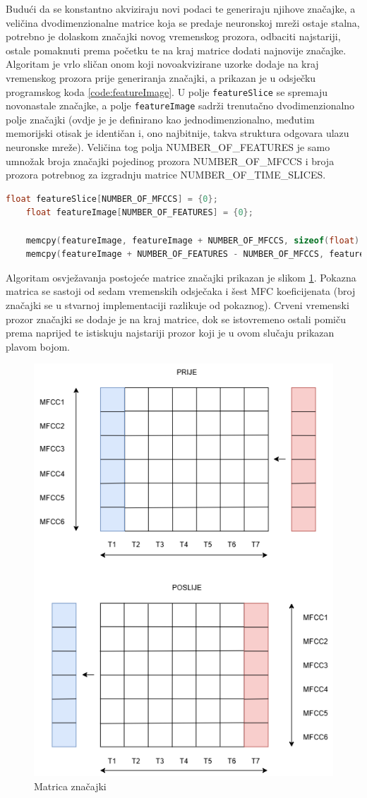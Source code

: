 Budući da se konstantno akviziraju novi podaci te generiraju njihove značajke, a veličina
dvodimenzionalne matrice koja se predaje neuronskoj mreži ostaje stalna, potrebno je 
dolaskom značajki novog vremenskog prozora, odbaciti najstariji, ostale pomaknuti prema početku
te na kraj matrice dodati najnovije značajke. Algoritam je vrlo sličan onom koji novoakvizirane
uzorke dodaje na kraj vremenskog prozora prije generiranja značajki, a prikazan je u odsječku
programskog koda \ref{code:featureImage}. U polje \texttt{featureSlice} se spremaju novonastale
značajke, a polje \texttt{featureImage} sadrži trenutačno dvodimenzionalno polje značajki (ovdje je
je definirano kao jednodimenzionalno, međutim memorijski otisak je identičan i, ono najbitnije,
takva struktura odgovara ulazu neuronske mreže). Veličina tog polja NUMBER\_OF\_FEATURES je samo
umnožak broja značajki pojedinog prozora NUMBER\_OF\_MFCCS i broja prozora potrebnog za 
izgradnju matrice NUMBER\_OF\_TIME\_SLICES.
\newpage
\begin{lstlisting}[language=C++, caption=Generiranje matrice značajki, label=code:featureImage]
    float featureSlice[NUMBER_OF_MFCCS] = {0};
    float featureImage[NUMBER_OF_FEATURES] = {0};

    memcpy(featureImage, featureImage + NUMBER_OF_MFCCS, sizeof(float) * (NUMBER_OF_FEATURES - NUMBER_OF_MFCCS));
    memcpy(featureImage + NUMBER_OF_FEATURES - NUMBER_OF_MFCCS, featureSlice, sizeof(float) * NUMBER_OF_MFCCS);
\end{lstlisting}

Algoritam osvježavanja postojeće matrice značajki prikazan je slikom \ref{pic:featureImage}. 
Pokazna matrica se sastoji od sedam vremenskih odsječaka i šest MFC koeficijenata
(broj značajki se u stvarnoj implementaciji razlikuje od pokaznog). Crveni 
vremenski prozor značajki se dodaje je na kraj matrice, dok se istovremeno ostali pomiču prema
naprijed te istiskuju najstariji prozor koji je u ovom slučaju prikazan plavom bojom.

\begin{figure}[htb]
    \centering
    \includegraphics[width=0.4\linewidth]{Chapters/struktura_sustava/generiranje_znacajki/featureImage.png} 
    \caption{Matrica značajki \cite{flowchart}}
    \label{pic:featureImage}
\end{figure}